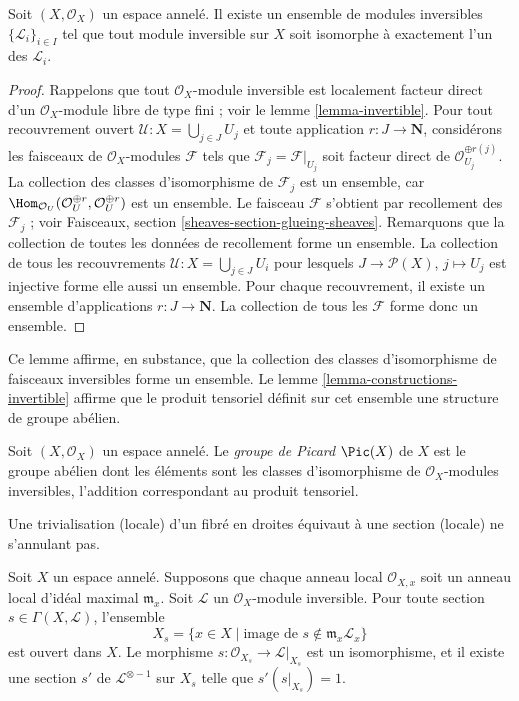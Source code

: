 \begin{lemma}
\label{lemma-pic-set}
Soit $(X, \mathcal{O}_X)$ un espace annelé.
Il existe un ensemble de modules inversibles $\{\mathcal{L}_i\}_{i \in I}$
tel que tout module inversible sur $X$ soit isomorphe à exactement
l'un des $\mathcal{L}_i$.
\end{lemma}

\begin{proof}
Rappelons que tout $\mathcal{O}_X$-module inversible est localement
facteur direct d'un $\mathcal{O}_X$-module libre de type fini ; voir le
lemme \ref{lemma-invertible}.
Pour tout recouvrement ouvert $\mathcal{U} : X = \bigcup_{j \in J} U_j$
et toute application $r : J \to \mathbf{N}$, considérons les faisceaux de
$\mathcal{O}_X$-modules $\mathcal{F}$ tels que
$\mathcal{F}_j = \mathcal{F}|_{U_j}$ soit facteur direct de
$\mathcal{O}_{U_j}^{\oplus r(j)}$.
La collection des classes d'isomorphisme de $\mathcal{F}_j$ est un ensemble, car
$\Hom_{\mathcal{O}_U}(\mathcal{O}_U^{\oplus r}, \mathcal{O}_U^{\oplus r})$
est un ensemble. Le faisceau $\mathcal{F}$ s'obtient par recollement des $\mathcal{F}_j$ ;
voir Faisceaux, section
\ref{sheaves-section-glueing-sheaves}. Remarquons que la collection de
toutes les données de recollement forme un ensemble. La collection de tous les recouvrements
$\mathcal{U} : X = \bigcup_{j \in J} U_i$ pour lesquels $J \to \mathcal{P}(X)$,
$j \mapsto U_j$ est injective forme elle aussi un ensemble. Pour chaque recouvrement,
il existe un ensemble d'applications $r : J \to \mathbf{N}$. La collection
de tous les $\mathcal{F}$ forme donc un ensemble.
\end{proof}

\noindent
Ce lemme affirme, en substance, que la collection des
classes d'isomorphisme de faisceaux inversibles forme un ensemble.
Le lemme \ref{lemma-constructions-invertible} affirme que
le produit tensoriel définit sur cet ensemble une structure de groupe
abélien.

\begin{definition}
\label{definition-pic}
Soit $(X, \mathcal{O}_X)$ un espace annelé.
Le {\it groupe de Picard} $\Pic(X)$ de $X$ est le
groupe abélien dont les éléments sont les classes d'isomorphisme de
$\mathcal{O}_X$-modules inversibles, l'addition
correspondant au produit tensoriel.
\end{definition}

\begin{lemma}
\label{lemma-s-open}
\begin{slogan}
Une trivialisation (locale) d'un fibré en droites
équivaut à une section (locale) ne s'annulant pas.
\end{slogan}
Soit $X$ un espace annelé. Supposons que chaque anneau local $\mathcal{O}_{X, x}$
soit un anneau local d'idéal maximal $\mathfrak m_x$.
Soit $\mathcal{L}$ un $\mathcal{O}_X$-module inversible.
Pour toute section $s \in \Gamma(X, \mathcal{L})$, l'ensemble
$$
X_s = \{x \in X \mid \text{image de }s \not\in \mathfrak m_x\mathcal{L}_x\}
$$
est ouvert dans $X$. Le morphisme $s : \mathcal{O}_{X_s} \to \mathcal{L}|_{X_s}$
est un isomorphisme, et il existe une section $s'$
de $\mathcal{L}^{\otimes -1}$ sur $X_s$ telle que $s' (s|_{X_s}) = 1$.
\end{lemma}

